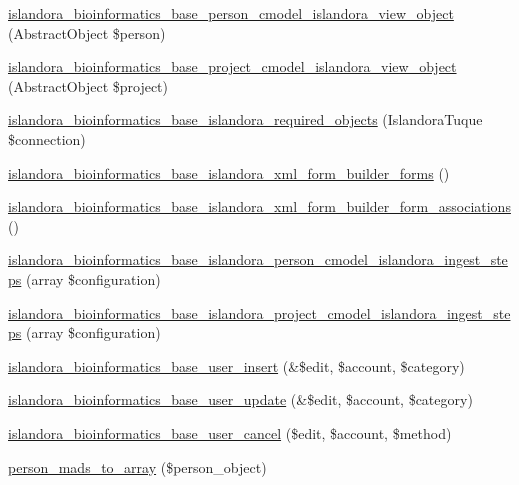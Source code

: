 \begin{DoxyCompactItemize}
\item 
\hyperlink{islandora__bioinformatics__base_8module_a28377c1d1eb3975107460a21b1900eaf}{islandora\+\_\+bioinformatics\+\_\+base\+\_\+person\+\_\+cmodel\+\_\+islandora\+\_\+view\+\_\+object} (Abstract\+Object \$person)
\item 
\hyperlink{islandora__bioinformatics__base_8module_aebd7ef53bd26dabff33c8d9ed965c355}{islandora\+\_\+bioinformatics\+\_\+base\+\_\+project\+\_\+cmodel\+\_\+islandora\+\_\+view\+\_\+object} (Abstract\+Object \$project)
\item 
\hyperlink{islandora__bioinformatics__base_8module_af49c8c4cdada468ea2f38053c815b8d0}{islandora\+\_\+bioinformatics\+\_\+base\+\_\+islandora\+\_\+required\+\_\+objects} (Islandora\+Tuque \$connection)
\item 
\hyperlink{islandora__bioinformatics__base_8module_a991861672652485988688d28b516bd2f}{islandora\+\_\+bioinformatics\+\_\+base\+\_\+islandora\+\_\+xml\+\_\+form\+\_\+builder\+\_\+forms} ()
\item 
\hyperlink{islandora__bioinformatics__base_8module_ac6e286f916e9b73cb3188ed36087132b}{islandora\+\_\+bioinformatics\+\_\+base\+\_\+islandora\+\_\+xml\+\_\+form\+\_\+builder\+\_\+form\+\_\+associations} ()
\item 
\hyperlink{islandora__bioinformatics__base_8module_aefe0d4e7b872b61e1fdf02d44dd11407}{islandora\+\_\+bioinformatics\+\_\+base\+\_\+islandora\+\_\+person\+\_\+cmodel\+\_\+islandora\+\_\+ingest\+\_\+steps} (array \$configuration)
\item 
\hyperlink{islandora__bioinformatics__base_8module_a52dced9b9bf216d349f5974cdcc0ec95}{islandora\+\_\+bioinformatics\+\_\+base\+\_\+islandora\+\_\+project\+\_\+cmodel\+\_\+islandora\+\_\+ingest\+\_\+steps} (array \$configuration)
\item 
\hyperlink{islandora__bioinformatics__base_8module_a0986c4a58fa2eed5df09ab9bdb7d6f47}{islandora\+\_\+bioinformatics\+\_\+base\+\_\+user\+\_\+insert} (\&\$edit, \$account, \$category)
\item 
\hyperlink{islandora__bioinformatics__base_8module_a1a3a11905730edcebeb2d8577756ae3e}{islandora\+\_\+bioinformatics\+\_\+base\+\_\+user\+\_\+update} (\&\$edit, \$account, \$category)
\item 
\hyperlink{islandora__bioinformatics__base_8module_aa5707478f46c88f1840a3d7e341fb5e1}{islandora\+\_\+bioinformatics\+\_\+base\+\_\+user\+\_\+cancel} (\$edit, \$account, \$method)
\item 
\hyperlink{islandora__bioinformatics__base_8module_a2d88db4e05c753b2fd28042ce12f1d12}{person\+\_\+mads\+\_\+to\+\_\+array} (\$person\+\_\+object)

\end{DoxyCompactItemize}
